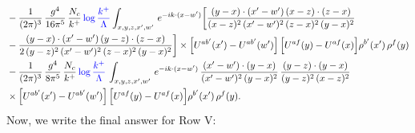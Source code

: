 \documentclass[9pt]{article}
\numberwithin{equation}{section}
\begin{document}
\begin{align}
&-\frac{1}{(2\pi)^{3}}\,\frac{g^{4}}{16\pi^{5}}\,\frac{N_{c}}{k^{+}}\,{\color{blue}\log\frac{k^{+}}{\Lambda}}\int_{x,y,z,x',w'}\,e^{-ik\cdot(x-w')} \bigg[\frac{(y-x)\cdot (x'-w')\,(x-z)\cdot (z-x)}{(x-z)^{2}\,(x'-w')^{2}\,(z-x)^{2}\,(y-x)^{2}}\notag \\ & -\frac{(y-x)\cdot (x'-w')\,(y-z)\cdot (z-x)}{2\,(y-z)^{2}\,(x'-w')^{2}\,(z-x)^{2}\,(y-x)^{2}}\bigg]\times\Big[U^{ab'}(x')-U^{ab'}(w')\Big]\,\Big[U^{af}(y)-U^{af}(x)\Big]\rho^{b'}(x')\,\rho^{f}(y)\notag\\
&-\frac{1}{(2\pi)^{3}}\,\frac{g^{4}}{8\pi^{5}}\,\frac{N_{c}}{k^{+}}\,{\color{blue}\log\frac{k^{+}}{\Lambda}}\,\int_{x,y,z,x',w'}\,e^{-ik\cdot(x-w')}\,\frac{(x'-w')\cdot(y-x)}{(x'-w')^{2}\,(y-x)^{2}}\,\frac{(y-z)\cdot(y-x)}{(y-z)^{2}\,(x-z)^{2}}\notag\\
&\times\Big[U^{ab'}(x')-U^{ab'}(w')\Big]\,\Big[U^{af}(y)-U^{af}(x)\Big]\rho^{b'}(x')\,\rho^{f}(y).
\end{align}
Now, we write the final answer for Row V:
\end{document}
